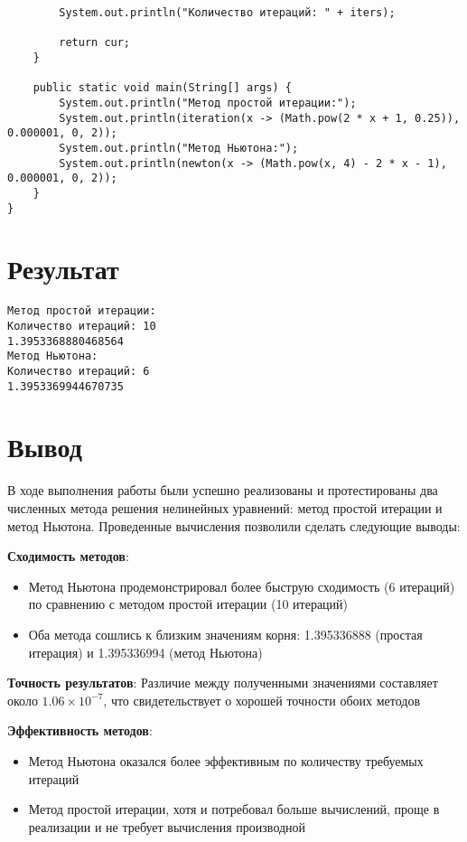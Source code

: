 \begin{verbatim}
        System.out.println("Количество итераций: " + iters);

        return cur;
    }

    public static void main(String[] args) {
        System.out.println("Метод простой итерации:");
        System.out.println(iteration(x -> (Math.pow(2 * x + 1, 0.25)), 0.000001, 0, 2));
        System.out.println("Метод Ньютона:");
        System.out.println(newton(x -> (Math.pow(x, 4) - 2 * x - 1), 0.000001, 0, 2));
    }
}
\end{verbatim}

\section*{Результат}

\begin{verbatim}
Метод простой итерации:
Количество итераций: 10
1.3953368880468564
Метод Ньютона:
Количество итераций: 6
1.3953369944670735
\end{verbatim}

\section*{Вывод}

В ходе выполнения работы были успешно реализованы и протестированы два численных метода решения нелинейных уравнений: 
метод простой итерации и метод Ньютона. Проведенные вычисления позволили сделать следующие выводы:

\textbf{Сходимость методов}:
\begin{itemize}
\item Метод Ньютона продемонстрировал более быструю сходимость (6 итераций) по сравнению с методом простой итерации (10 итераций)
\item Оба метода сошлись к близким значениям корня: 1.395336888 (простая итерация) и 1.395336994 (метод Ньютона)
\end{itemize}

\textbf{Точность результатов}:
Различие между полученными значениями составляет около $1.06 \times 10^{-7}$, что свидетельствует о хорошей точности обоих методов

\textbf{Эффективность методов}:
\begin{itemize}
\item Метод Ньютона оказался более эффективным по количеству требуемых итераций
\item Метод простой итерации, хотя и потребовал больше вычислений, проще в реализации и не требует вычисления производной
\end{itemize}

